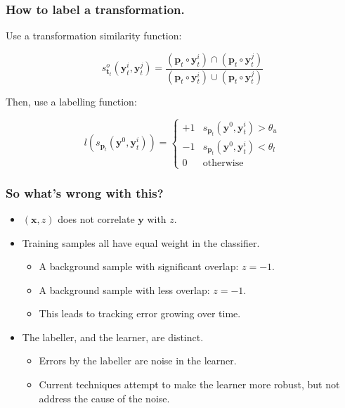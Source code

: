 \documentclass[mathserif,handout]{beamer}
\begin{document}
\begin{frame}
    \frametitle{How to label a transformation.}
    Use a transformation similarity function:

    \begin{equation}
        s_{\mathbf{t}_t}^o \left( \mathbf{y}_t^i, \mathbf{y}_t^j \right) =
            \frac{\left( \mathbf{p}_t \circ \mathbf{y}_t^i \right) \cap \left( \mathbf{p}_t \circ \mathbf{y}_t^j \right)}
                 {\left( \mathbf{p}_t \circ \mathbf{y}_t^i \right) \cup \left( \mathbf{p}_t \circ \mathbf{y}_t^j \right)}
    \end{equation}

    Then, use a labelling function:

    \begin{equation}
        l\left( s_{\mathbf{p}_t}\left(\mathbf{y}^0, \mathbf{y}_t^i \right) \right) =
            \begin{cases}
                +1 & s_{\mathbf{p}_t}\left(\mathbf{y}^0, \mathbf{y}_t^i \right) > \theta_u \\
                -1 & s_{\mathbf{p}_t}\left(\mathbf{y}^0, \mathbf{y}_t^i \right) < \theta_l \\
                 0 & \text{otherwise}
            \end{cases}
    \end{equation}
\end{frame}

\begin{frame}
    \frametitle{So what's wrong with this?}

    \begin{itemize}
        \item $(\mathbf{x}, z)$ does not correlate $\mathbf{y}$ with $z$.
        \item Training samples all have equal weight in the classifier.
            \begin{itemize}
                \item A background sample with significant overlap: $z = -1$.
                \item A background sample with less overlap: $z = -1$.
                \item This leads to tracking error growing over time.
            \end{itemize}
        \item The labeller, and the learner, are distinct.
            \begin{itemize}
                \item Errors by the labeller are noise in the learner.
                \item Current techniques attempt to make the learner more
                    robust, but not address the cause of the noise.
            \end{itemize}
    \end{itemize}
\end{frame}
\end{document}

